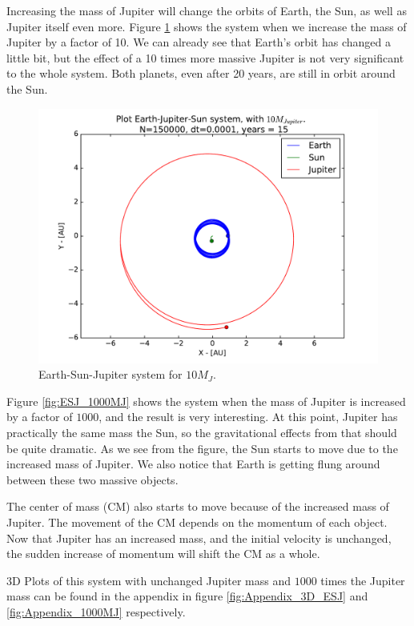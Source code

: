 \documentclass[12pt]{article}
\begin{document}
Increasing the mass of Jupiter will change the orbits of Earth, the Sun, as well as Jupiter itself even more. Figure \ref{ESJ_10MJ} shows the system when we increase the mass of Jupiter by a factor of 10. We can already see that Earth's orbit has changed a little bit, but the effect of a 10 times more massive Jupiter is not very significant to the whole system. Both planets, even after 20 years, are still in orbit around the Sun.
\begin{figure}[!h]
\centering
\includegraphics[width=\linewidth]{Plots/Earth_Sun_Jupiter_10MJ.pdf}
\caption{Earth-Sun-Jupiter system for $10M_J$.}
\label{ESJ_10MJ}
\end{figure}

Figure \ref{fig:ESJ_1000MJ} shows the system when the mass of Jupiter is increased by a factor of $1000$, and the result is very interesting. At this point, Jupiter has practically the same mass the Sun, so the gravitational effects from that should be quite dramatic. As we see from the figure, the Sun starts to move due to the increased mass of Jupiter. We also notice that Earth is getting flung around between these two massive objects. 

The center of mass (CM) also starts to move because of the increased mass of Jupiter. The movement of the CM depends on the momentum of each object. Now that Jupiter has an increased mass, and the initial velocity is unchanged, the sudden increase of momentum will shift the CM as a whole. 


3D Plots of this system with unchanged Jupiter mass and $1000$ times the Jupiter mass can be found in the appendix in figure \ref{fig:Appendix_3D_ESJ} and \ref{fig:Appendix_1000MJ} respectively.
\end{document}
